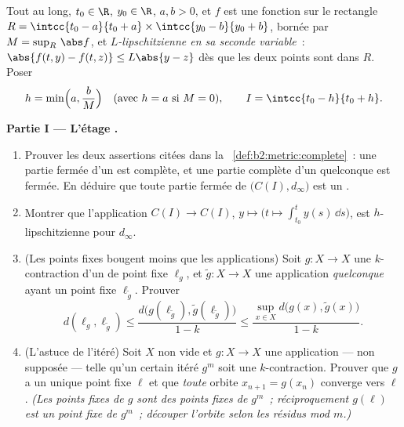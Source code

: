 \begin{problem}
\label{pb:b2:metric:1}
Tout au long, $t_0 \in \R$, $y_0 \in \R$, $a, b > 0$, et $f$ est une
fonction  sur le rectangle $R = \intcc{t_0 - a}{t_0 + a}
\times \intcc{y_0 - b}{y_0 + b}$, bornée par $M = \sup_R\,\abs f$, et
\emph{$L$-lipschitzienne en sa seconde variable}~: $\abs{f(t, y) -
f(t, z)} \leq L\abs{y - z}$ dès que les deux points sont dans $R$.
Poser
\[
h = \min\Bigl(a, \frac bM\Bigr) \quad (\text{avec } h = a
\text{ si } M = 0), \qquad I = \intcc{t_0 - h}{t_0 + h}.
\]

\medskip
\noindent\textbf{Partie I --- L'étage .}
\begin{enumerate}
  \item Prouver les deux assertions citées dans la~%
        \cref{def:b2:metric:complete}~: une partie fermée d'un  est complète, et une partie complète d'un
         quelconque est fermée. En déduire que toute
        partie fermée de $\bigl(C(I), d_\infty\bigr)$ est un .
  \item Montrer que l'application $C(I) \to C(I)$, $y \mapsto \bigl(t
        \mapsto \int_{t_0}^{t}y(s)\,\dd s\bigr)$, est
        $h$-lipschitzienne pour $d_\infty$.
  \item (Les points fixes bougent moins que les applications) Soit $g
        \colon X \to X$ une $k$-contraction d'un  de
        point fixe $\ell_g$, et $\widetilde g \colon X \to X$ une
        application \emph{quelconque} ayant un point fixe
        $\ell_{\widetilde g}$. Prouver
        \[
        d(\ell_g, \ell_{\widetilde g}) \leq
        \frac{d\bigl(g(\ell_{\widetilde g}),
        \widetilde g(\ell_{\widetilde g})\bigr)}{1 - k}
        \leq \frac{\sup_{x \in X} d\bigl(g(x), \widetilde
        g(x)\bigr)}{1 - k}.
        \]
  \item (L'astuce de l'itéré) Soit $X$  non vide et $g \colon
        X \to X$ une application --- non supposée  --- telle
        qu'un certain itéré $g^m$ soit une $k$-contraction. Prouver
        que $g$ a un unique point fixe $\ell$ et que \emph{toute}
        orbite $x_{n+1} = g(x_n)$ converge vers $\ell$. \emph{(Les
        points fixes de $g$ sont des points fixes de $g^m$~;
        réciproquement $g(\ell)$ est un point fixe de $g^m$~;
        découper l'orbite selon les résidus mod $m$.)}
\end{enumerate}


\end{problem}
